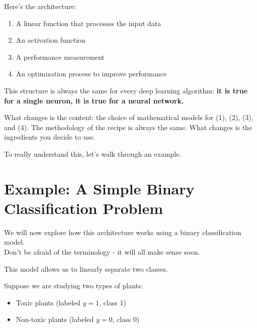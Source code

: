 \documentclass[11pt]{article}
\begin{document}
\vspace{1em}

Here's the architecture:

\begin{enumerate}
    \item A linear function that processes the input data
    \item An activation function
    \item A performance measurement
    \item An optimization process to improve performance
\end{enumerate}

\vspace{0.5em}

This structure is always the same for every deep learning algorithm: \textbf{it is true for a single neuron, it is true for a neural network.}

\vspace{0.5em}

What changes is the content: the choice of mathematical models for (1), (2), (3), and (4).  
The methodology of the recipe is always the same. What changes is the ingredients you decide to use.

\vspace{1em}

To really understand this, let's walk through an example.

\section*{Example: A Simple Binary Classification Problem}

We will now explore how this architecture works using a binary classification model.\\
Don't be afraid of the terminology - it will all make sense soon.

\vspace{1em}

This model allows us to linearly separate two classes.

Suppose we are studying two types of plants:

\begin{itemize}
    \item Toxic plants (labeled $y = 1$, class 1)
    \item Non-toxic plants (labeled $y = 0$, class 0)
\end{itemize}

\vspace{0.5em}
\end{document}
